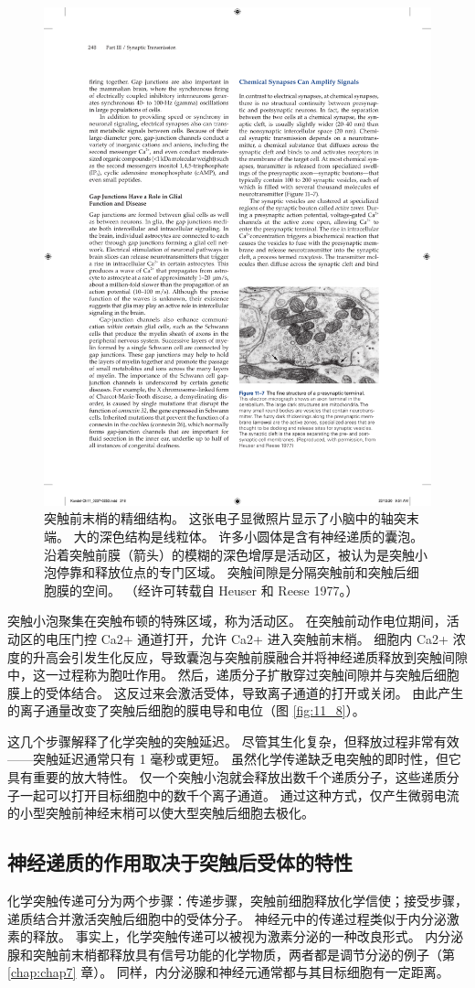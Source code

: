 \begin{figure}[htbp]
	\centering
	\includegraphics[width=0.5\linewidth]{chap11/fig_11_7}
	\caption{突触前末梢的精细结构。 这张电子显微照片显示了小脑中的轴突末端。 大的深色结构是线粒体。 许多小圆体是含有神经递质的囊泡。 沿着突触前膜（箭头）的模糊的深色增厚是活动区，被认为是突触小泡停靠和释放位点的专门区域。 突触间隙是分隔突触前和突触后细胞膜的空间。 （经许可转载自 Heuser 和 Reese 1977。）}
	\label{fig:11_7}
\end{figure}


突触小泡聚集在突触布顿的特殊区域，称为活动区。 
在突触前动作电位期间，活动区的电压门控 Ca2+ 通道打开，允许 Ca2+ 进入突触前末梢。 
细胞内 Ca2+ 浓度的升高会引发生化反应，导致囊泡与突触前膜融合并将神经递质释放到突触间隙中，这一过程称为胞吐作用。 
然后，递质分子扩散穿过突触间隙并与突触后细胞膜上的受体结合。 
这反过来会激活受体，导致离子通道的打开或关闭。 
由此产生的离子通量改变了突触后细胞的膜电导和电位（图 \ref{fig:11_8}）。


这几个步骤解释了化学突触的突触延迟。 
尽管其生化复杂，但释放过程非常有效——突触延迟通常只有 1 毫秒或更短。 
虽然化学传递缺乏电突触的即时性，但它具有重要的放大特性。 
仅一个突触小泡就会释放出数千个递质分子，这些递质分子一起可以打开目标细胞中的数千个离子通道。 
通过这种方式，仅产生微弱电流的小型突触前神经末梢可以使大型突触后细胞去极化。



\subsection{神经递质的作用取决于突触后受体的特性}
化学突触传递可分为两个步骤：传递步骤，突触前细胞释放化学信使；接受步骤，递质结合并激活突触后细胞中的受体分子。 
神经元中的传递过程类似于内分泌激素的释放。 
事实上，化学突触传递可以被视为激素分泌的一种改良形式。 内分泌腺和突触前末梢都释放具有信号功能的化学物质，两者都是调节分泌的例子（第 \ref{chap:chap7} 章）。 
同样，内分泌腺和神经元通常都与其目标细胞有一定距离。


